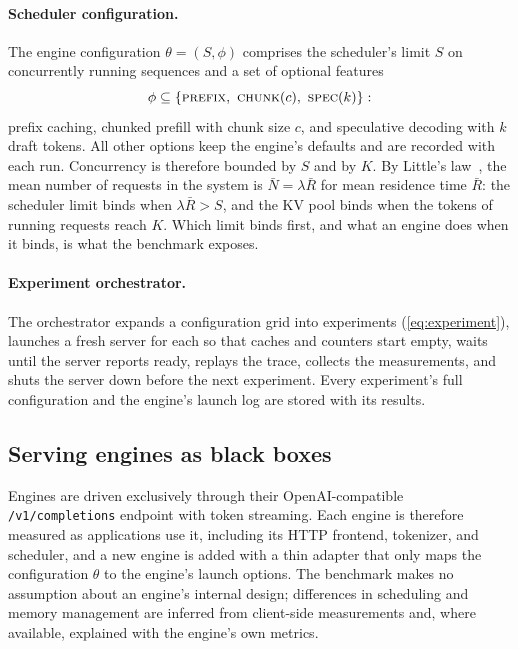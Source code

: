 \paragraph{Scheduler configuration.}
The engine configuration $\theta = (S, \phi)$ comprises the scheduler's limit $S$ on concurrently
running sequences and a set of optional features
\begin{equation}
  \phi \subseteq \{\textsc{prefix},\ \textsc{chunk}(c),\ \textsc{spec}(k)\}:
  \label{eq:features}
\end{equation}
prefix caching, chunked prefill with chunk size $c$, and speculative decoding with $k$ draft
tokens. All other options keep
the engine's defaults and are recorded with each run. Concurrency is therefore bounded by $S$ and by
$K$. By Little's law~\cite{little1961}, the mean number of requests in the system is
$\bar{N} = \lambda \bar{R}$ for mean residence time $\bar{R}$: the scheduler limit binds when
$\lambda \bar{R} > S$, and the KV pool binds when the tokens of running requests reach $K$.
Which limit binds first, and what an engine does when it binds, is what the benchmark exposes.

\paragraph{Experiment orchestrator.}
The orchestrator expands a configuration grid into experiments (\cref{eq:experiment}), launches a
fresh server for each so that caches and counters start empty, waits until the server reports
ready, replays the trace, collects the measurements, and shuts the server down before the next
experiment. Every experiment's full configuration and the engine's launch log are stored with its
results.

\subsection{Serving engines as black boxes}
\label{sec:engines-bb}

Engines are driven exclusively through their OpenAI-compatible \texttt{/v1/completions} endpoint
with token streaming. Each engine is therefore measured as applications use it, including its HTTP
frontend, tokenizer, and scheduler, and a new engine is added with a thin adapter that only maps the
configuration $\theta$ to the engine's launch options. The benchmark makes no assumption about an
engine's internal design; differences in scheduling and memory management are inferred from
client-side measurements and, where available, explained with the engine's own metrics.

